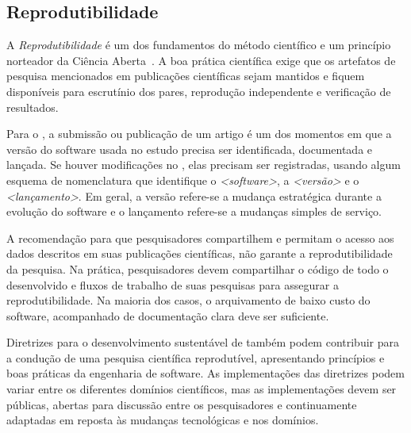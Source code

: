 \subsection{Reprodutibilidade} \label{subsection:srrs}

A \textit{Reprodutibilidade} é um dos fundamentos do método científico e um princípio norteador da Ciência Aberta~\cite{unesco:2021}.
A boa prática científica exige que os artefatos de pesquisa mencionados em publicações científicas sejam mantidos e fiquem disponíveis para escrutínio dos pares, reprodução independente e verificação de resultados.

Para o \RS, a submissão ou publicação de um artigo é um dos momentos em que a versão do software usada no estudo precisa ser identificada, documentada e lançada.
% 
Se houver modificações no \RS, elas precisam ser registradas, 
usando algum esquema de nomenclatura que identifique o 
\textit{<software>}, a \textit{<versão>} e o \textit{<lançamento>}.
Em geral, a versão refere-se a mudança estratégica durante a evolução do software e o lançamento refere-se a mudanças simples de serviço.

A recomendação para que pesquisadores compartilhem e permitam o acesso aos dados descritos em suas publicações científicas, não garante a reprodutibilidade da pesquisa. 
Na prática, pesquisadores devem compartilhar o código de todo o \RSw desenvolvido e fluxos de trabalho de suas pesquisas para assegurar a reprodutibilidade.
Na maioria dos casos, o arquivamento de baixo custo do software, acompanhado de documentação clara deve ser suficiente.

Diretrizes para o desenvolvimento sustentável de \RSw também podem contribuir para a condução de uma pesquisa científica reprodutível,
apresentando princípios e boas práticas da engenharia de software.
As implementações das diretrizes podem variar entre os diferentes domínios científicos, mas as implementações devem ser públicas, abertas para discussão entre os pesquisadores e continuamente adaptadas em reposta às mudanças tecnológicas e nos domínios.

